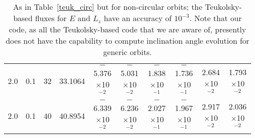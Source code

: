 \documentclass[aps,prd,twocolumn,showpacs,groupedaddress,nofootinbib]{revtex4}
\begin{document}
\begin{widetext}
\begin{table}[h]
\begin{tabular}{|c|c|c|c|c|c|c|c|c|c|}
  2.0&  0.1& 32& 33.1064& $-$5.376$\times$10$^{-2}$& $-$5.031$\times$10$^{-2}$& $-$1.838$\times$10$^{-1}$& $-$1.736$\times$10$^{-1}$&  2.684$\times$10$^{-2}$&    1.793$\times$10$^{-2}$\\
  2.0&  0.1& 40& 40.8954& $-$6.339$\times$10$^{-2}$& $-$6.236$\times$10$^{-2}$& $-$2.027$\times$10$^{-1}$& $-$1.967$\times$10$^{-1}$&  2.917$\times$10$^{-2}$&    2.036$\times$10$^{-2}$\\
\hline
\end{tabular}
\caption{As in Table~\ref{teuk_circ} but for non-circular orbits;
the Teukolsky-based fluxes for $E$ and $L_z$ have an accuracy of $10^{-3}$.
Note that our code, as all the Teukolsky-based code that we are aware of, 
presently does not have the capability to compute inclination angle evolution for generic
orbits.\label{teuk_ecc1}} 
\end{table}


\end{widetext}
\end{document}
